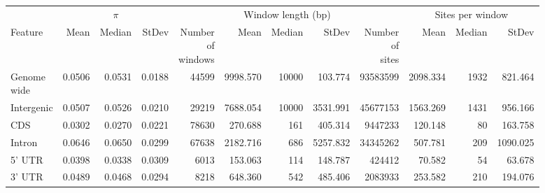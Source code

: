 \begin{table}
    \centering
    \label{tab:sup_feature_pi}
    \begin{tabular}{lrrrrrrrrrrr}
        \toprule
        & \multicolumn{3}{c}{$\pi$} & &
            \multicolumn{3}{c}{Window length (bp)} & &
            \multicolumn{3}{c}{Sites per window} \\
        \cmidrule(lr){2-4} \cmidrule(lr){6-8} \cmidrule(lr){10-12}
        Feature &
            Mean & Median & StDev &
            \shortstack{Number \\ of \\ windows} &
            Mean & Median & StDev &
            \shortstack{Number \\ of \\ sites} &
            Mean & Median & StDev \\
        \midrule
        \shortstack[l]{Genome\\wide}       & 0.0506 & 0.0531               & 0.0188 & \num{44599} & \num{9998.570} & \num{10000} & 103.774        & \num{93583599} & \num{2098.334} & \num{1932} & 821.464 \\
        Intergenic                         & 0.0507 & 0.0526               & 0.0210 & \num{29219} & \num{7688.054} & \num{10000} & \num{3531.991} & \num{45677153} & \num{1563.269} & \num{1431} & 956.166 \\
        CDS                                & 0.0302 & 0.0270               & 0.0221 & \num{78630} & 270.688        & 161         & 405.314        & \num{9447233}  & 120.148        & 80         & 163.758 \\
        Intron                             & 0.0646 & 0.0650               & 0.0299 & \num{67638} & \num{2182.716} & 686         & \num{5257.832} & \num{34345262} & 507.781        & 209        & \num{1090.025} \\
        5' UTR                             & 0.0398 & 0.0338               & 0.0309 & \num{6013}  & 153.063        & 114         & 148.787        & \num{424412}   & 70.582         & 54         & 63.678 \\
        3' UTR                             & 0.0489 & 0.0468               & 0.0294 & \num{8218}  & 648.360        & 542         & 485.406        & \num{2083933}  & 253.582        & 210        & 194.076 \\

\end{tabular}
\end{table}

